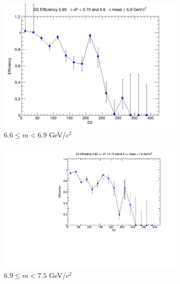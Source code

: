 \begin{figure}[p]
\begin{subfigure}[b]{0.32\textwidth}
        \includegraphics[width=\textwidth]{./kTrackerEfficiencyPlots/D2_Efficiency_xF13_mass8.png}
        \caption{$6.6 \leq m < 6.9$ GeV/$c^2$}
        \label{fig:xF13_mass8}
    \end{subfigure}
    \vspace{0.5cm}
    \begin{subfigure}[b]{0.32\textwidth}
        \centering
        \includegraphics[width=\textwidth]{./kTrackerEfficiencyPlots/D2_Efficiency_xF13_mass9.pdf}
        \caption{$6.9 \leq m < 7.5$ GeV/$c^2$}
        \label{fig:xF13_mass9}
    \end{subfigure}
    \hfill
    \begin{subfigure}[b]{0.32\textwidth}
        \centering

\end{subfigure}
\end{figure}
